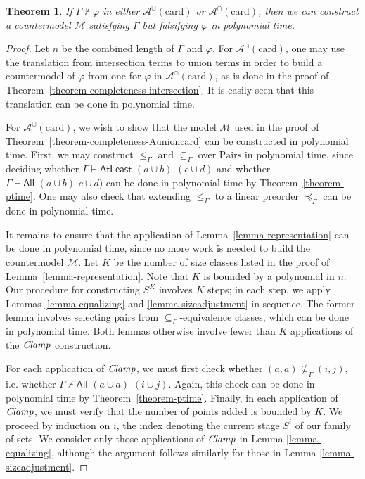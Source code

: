 \documentclass[letterpaper]{article}
\newtheorem{theorem}{Theorem}[section]
\theoremstyle{definition}
\newcommand{\Model}{\mathcal{M}}
\newcommand{\proves}{\vdash}
\newcommand{\Aunion}{\mathscr{A}^{\cup}}
\newcommand{\Ainter}{\mathscr{A}^{\cap}}
\newcommand{\All}[2]{\mathsf{All}\,\,#1\,\,#2}
\newcommand{\Atleast}[2]{\mathsf{AtLeast}\,\,#1\,\,#2}
\newcommand{\card}{\mathrm{card}}
\newcommand{\Pairs}{\mbox{Pairs}}
\newcommand{\Clamp}{\protect{\mbox{\textit{Clamp}}}}
\newcommand{\provsub}{\subseteq_{\Gamma}}
\newcommand{\provle}{\le_{\Gamma}}
\newcommand{\provextended}{\preceq_{\Gamma}}
\begin{document}
\begin{theorem}
If $\Gamma \not \proves \varphi$ in either $\Aunion(\card)$ or $\Ainter(\card)$, then we can construct a countermodel $\Model$ satisfying $\Gamma$ but falsifying $\varphi$ in polynomial time.
\label{theorem-ptime-model-building}
\end{theorem}
\begin{proof}

Let $n$ be the combined length of $\Gamma$ and $\varphi$. For $\Ainter(\card)$, one may use the translation from intersection terms to union terms in order to build a countermodel of $\varphi$ from one for $\varphi$ in $\Ainter(\card)$, as is done in the proof of Theorem~\ref{theorem-completeness-intersection}.  It is easily seen that this translation can be done in polynomial time.

For $\Aunion(\card)$, we wish to show that the model $\Model$ used in the proof of Theorem~\ref{theorem-completeness-Aunioncard} can be constructed in polynomial time.  First, we may construct $\provle$ and $\provsub$ over $\Pairs$ in polynomial time, since deciding whether $\Gamma \proves \Atleast{(a \cup b)}{(c \cup d)}$ and whether $\Gamma \proves \All{(a \cup b)}{c \cup d)}$ can be done in polynomial time by Theorem~\ref{theorem-ptime}.  One may also check that extending $\provle$ to a linear preorder $\provextended$ can be done in polynomial time.

It remains to ensure that the application of Lemma~\ref{lemma-representation} can be done in polynomial time, since no more work is needed to build the countermodel $\Model$.  Let $K$ be the number of size classes listed in the proof of Lemma~\ref{lemma-representation}.  Note that $K$ is bounded by a polynomial in $n$.  Our procedure for constructing $S^K$ involves $K$ steps; in each step, we apply Lemmas \ref{lemma-equalizing} and \ref{lemma-sizeadjustment} in sequence.  The former lemma involves selecting pairs from $\provsub$-equivalence classes, which can be done in polynomial time.  Both lemmas otherwise involve fewer than $K$ applications of the $\Clamp$ construction.  

For each application of $\Clamp$, we must first check whether $(a, a) \not \provsub (i, j)$, i.e. whether $\Gamma \not \proves \All{(a \cup a)}{(i \cup j)}.$   Again, this check can be done in polynomial time by Theorem~\ref{theorem-ptime}.
Finally, in each application of $\Clamp$, we must verify that the number of points added is bounded by $K$.  We proceed by induction on $i$, the index denoting the current stage $S^i$ of our family of sets.  We consider only those applications of $\Clamp$ in Lemma \ref{lemma-equalizing}, although the argument follows similarly for those in Lemma \ref{lemma-sizeadjustment}.


\end{proof}
\end{document}
